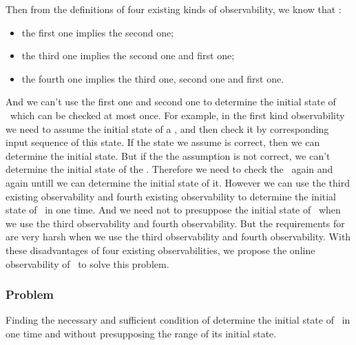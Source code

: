 Then from the definitions of  four existing kinds of observability, we know that \cite{Zhang2016Observability}:
\begin{itemize}
  \item the first one implies the second one;
  \item the third one implies the second one and first one;
  \item the fourth one implies the third one, second one and first one.
\end{itemize} 
 And we can't use the first one and second one to determine the initial state of \BCNs\ which can be checked at most once. For example, in the first kind observability we need to assume the initial state of a \BCN, and then check it by corresponding input sequence of this state. If the state we assume is correct, then we can determine the initial state. But if the the assumption is not correct, we can't determine the initial state of the \BCN. Therefore we need to check the \BCN\ again and again untill we can determine the initial state of it. However we can use the third existing observability and fourth existing observability to determine the initial state of \BCNs\ in one time. And we need not to presuppose the initial state of \BCNs\ when we use the third observability and fourth observability. But the requirements for \BCNs are very harsh when we use the third observability and fourth observability. With these disadvantages of four existing observabilities, we propose the online observability of \BCNs\ to solve this problem.
 \subsubsection*{Problem}
Finding the necessary and sufficient condition of determine the initial state of \BCNs\ in one time and without presupposing the range of its initial state.